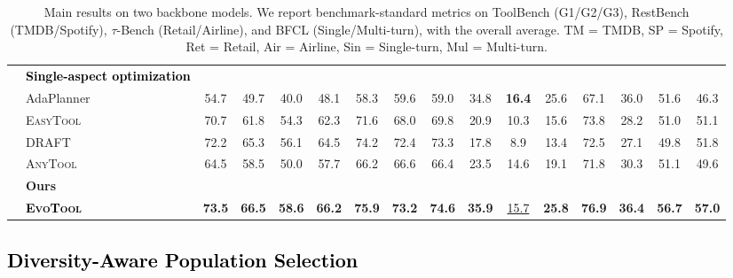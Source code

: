 \documentclass[11pt]{article}
\begin{document}
\begin{table}[!t]
{\begin{tabular}{c|l|cccc|ccc|ccc|ccc|c}
& \multicolumn{1}{l}{\cellcolor{gray!15}\textbf{\textcolor{black}{Single-aspect optimization}}}
& \multicolumn{14}{c}{\cellcolor{gray!15}} \\
& \quad AdaPlanner    & 54.7 & 49.7 & 40.0 & 48.1 & 58.3 & 59.6 & 59.0 & 34.8 & \textbf{16.4} & 25.6 & 67.1 & 36.0 & 51.6 & 46.3 \\
& \quad \textsc{EasyTool}      & 70.7 & 61.8 & 54.3 & 62.3 & 71.6 & 68.0 & 69.8 & 20.9 & 10.3 & 15.6 & 73.8 & 28.2 & 51.0 & 51.1 \\
& \quad DRAFT         & 72.2 & 65.3 & 56.1 & 64.5 & 74.2 & 72.4 & 73.3 & 17.8 & 8.9 & 13.4 & 72.5 & 27.1 & 49.8 & 51.8 \\
& \quad \textsc{AnyTool}       & 64.5 & 58.5 & 50.0 & 57.7 & 66.2 & 66.6 & 66.4 & 23.5 & 14.6 & 19.1 & 71.8 & 30.3 & 51.1 & 49.6 \\

& \multicolumn{1}{l}{\cellcolor{gray!15}\textbf{Ours}}
& \multicolumn{14}{c}{\cellcolor{gray!15}} \\
& \quad \textbf{\textcolor{black}{\textsc{EvoTool}}} & \textbf{73.5} & \textbf{66.5} & \textbf{58.6} & \textbf{66.2} & \textbf{75.9} & \textbf{73.2} & \textbf{74.6} & \textbf{35.9} & \underline{15.7} & \textbf{25.8} & \textbf{76.9} & \textbf{36.4} & \textbf{56.7} & \textbf{57.0} \\
\bottomrule
\end{tabular}%
}

\caption{Main results on two backbone models. We report benchmark-standard metrics on ToolBench (G1/G2/G3), RestBench (TMDB/Spotify), $\tau$-Bench (Retail/Airline), and BFCL (Single/Multi-turn), with the overall average. TM = TMDB, SP = Spotify, Ret = Retail, Air = Airline, Sin = Single-turn, Mul = Multi-turn.}
\label{tab:main_results_streams}
\end{table}





\textcolor{black}{\subsection{Diversity-Aware Population Selection}}
\label{sec: population selection}

\end{document}
